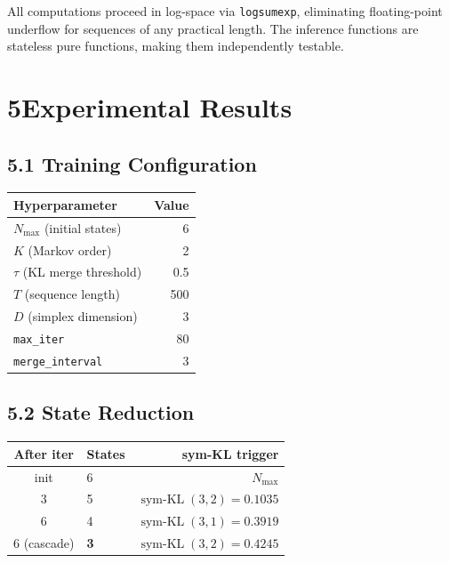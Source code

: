 \documentclass[10pt,a4paper,twocolumn]{article}
\DeclareMathOperator{\symKL}{sym\text{-}KL}
\begin{document}
\smallskip
All computations proceed in log-space via \texttt{logsumexp}, eliminating
floating-point underflow for sequences of any practical length.  The inference
functions are stateless pure functions, making them independently testable.

\section*{5\quad Experimental Results}

\subsection*{5.1\; Training Configuration}

\begin{center}
\footnotesize
\renewcommand{\arraystretch}{1.1}
\begin{tabular}{@{}lr@{}}
\toprule
\textbf{Hyperparameter} & \textbf{Value} \\
\midrule
$N_{\max}$ (initial states) & 6 \\
$K$ (Markov order)          & 2 \\
$\tau$ (KL merge threshold) & 0.5 \\
$T$ (sequence length)       & 500 \\
$D$ (simplex dimension)     & 3 \\
\texttt{max\_iter}          & 80 \\
\texttt{merge\_interval}    & 3 \\
\bottomrule
\end{tabular}
\end{center}

\subsection*{5.2\; State Reduction}

\begin{center}
\footnotesize
\renewcommand{\arraystretch}{1.1}
\begin{tabular}{@{}clr@{}}
\toprule
\textbf{After iter} & \textbf{States} & \textbf{sym-KL trigger} \\
\midrule
init  & 6 & $N_{\max}$ \\
3     & 5 & $\symKL(3,2) = 0.1035$ \\
6     & 4 & $\symKL(3,1) = 0.3919$ \\
6 (cascade) & \textbf{3} & $\symKL(3,2) = 0.4245$ \\
\bottomrule
\end{tabular}
\end{center}
\end{document}
